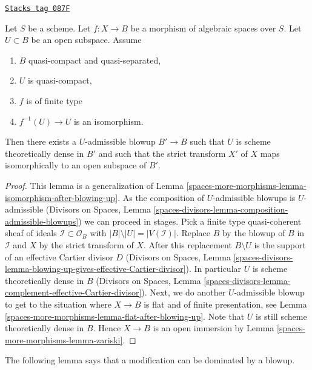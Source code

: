 \begin{lemma}
\label{spaces-more-morphisms-lemma-zariski-after-blowup}
\href{https://stacks.math.columbia.edu/tag/087F}{\texttt{Stacks tag 087F}}

Let $S$ be a scheme. Let $f : X \to B$ be a morphism of algebraic spaces
over $S$. Let $U \subset B$ be an open subspace. Assume
\begin{enumerate}
\item $B$ quasi-compact and quasi-separated,
\item $U$ is quasi-compact,
\item $f$ is of finite type
\item $f^{-1}(U) \to U$ is an isomorphism.
\end{enumerate}
Then there exists a $U$-admissible blowup $B' \to B$ such that $U$
is scheme theoretically dense in $B'$ and such that the strict
transform $X'$ of $X$ maps isomorphically to an open subspace of $B'$.
\end{lemma}

\begin{proof}
This lemma is a generalization of
Lemma \ref{spaces-more-morphisms-lemma-isomorphism-after-blowing-up}.
As the composition of $U$-admissible blowups is $U$-admissible
(Divisors on Spaces, Lemma
\ref{spaces-divisors-lemma-composition-admissible-blowups})
we can proceed in stages. Pick a finite type quasi-coherent sheaf
of ideals $\mathcal{I} \subset \mathcal{O}_B$ with
$|B| \setminus |U| = |V(\mathcal{I})|$. Replace $B$ by the blowup
of $B$ in $\mathcal{I}$ and $X$ by the strict transform of $X$.
After this replacement $B \setminus U$ is the support of an effective
Cartier divisor $D$ (Divisors on Spaces, Lemma
\ref{spaces-divisors-lemma-blowing-up-gives-effective-Cartier-divisor}).
In particular $U$ is scheme theoretically dense in $B$
(Divisors on Spaces, Lemma
\ref{spaces-divisors-lemma-complement-effective-Cartier-divisor}).
Next, we do another $U$-admissible blowup to get to the situation where
$X \to B$ is flat and of finite presentation, see
Lemma \ref{spaces-more-morphisms-lemma-flat-after-blowing-up}. Note that $U$ is still scheme
theoretically dense in $B$. Hence $X \to B$ is an open immersion by
Lemma \ref{spaces-more-morphisms-lemma-zariski}.
\end{proof}

The following lemma says that a modification can be dominated
by a blowup.

